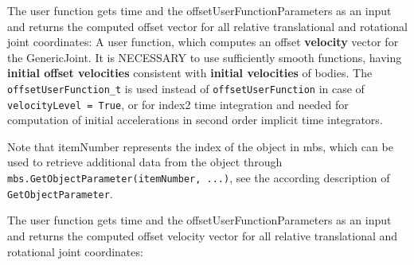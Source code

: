     The user function gets time and the offsetUserFunctionParameters as an input and returns the computed offset vector 
    for all relative translational and rotational joint coordinates:
    \finishTable
%
    A user function, which computes an offset {\bf velocity} vector for the GenericJoint.
    It is NECESSARY to use sufficiently smooth functions, having {\bf initial offset velocities} consistent with {\bf initial velocities} of bodies.
    The \texttt{offsetUserFunction\_t} is used instead of \texttt{offsetUserFunction} in case of \texttt{velocityLevel = True}, 
    or for index2 time integration and needed for computation of initial accelerations in second order implicit time integrators.

    Note that itemNumber represents the index of the object in mbs, which can be used to retrieve additional data from the object through
    \texttt{mbs.GetObjectParameter(itemNumber, ...)}, see the according description of \texttt{GetObjectParameter}.

    The user function gets time and the offsetUserFunctionParameters as an input and returns the computed offset velocity vector 
    for all relative translational and rotational joint coordinates:
    \finishTable
%

